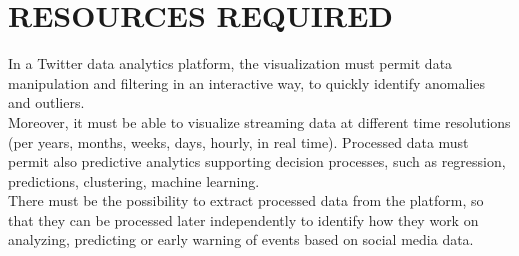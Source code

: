 \documentclass[preprint,12pt]{elsarticle}
\begin{document}







\section{RESOURCES REQUIRED}
\label{S:2}

In a Twitter data analytics platform, the visualization must permit data manipulation and filtering in an interactive way, to quickly identify anomalies and outliers.\\
Moreover, it must be able to visualize streaming data at different time resolutions (per years, months, weeks, days, hourly, in real time). Processed data must permit also predictive analytics supporting decision processes, such as regression, predictions, clustering, machine learning. \\
There must be the possibility to extract processed data from the platform, so that they can be processed later independently to identify how they work on analyzing, predicting or early warning of events based on social media data.\\
\end{document}
